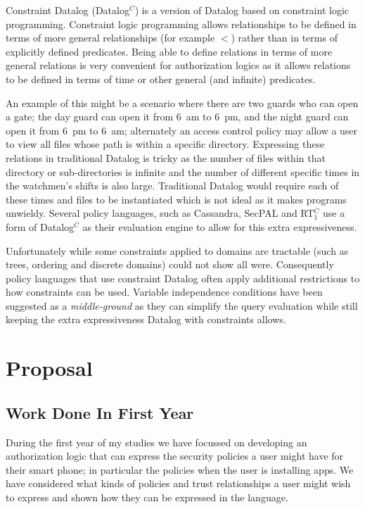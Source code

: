 \documentclass[a4paper,12pt,sfsidenotes]{tufte-book}
\begin{document}
Constraint Datalog (Datalog$^C$\cite{Li:2003ix}) is a version of Datalog based
on constraint logic programming.  Constraint logic programming allows
relationships to be defined in terms of more general relationships (for example
$<$) rather than in terms of explicitly defined predicates.  Being able to
define relations in terms of more general relations is very convenient for
authorization logics as it allows relations to be defined in terms of time or
other general (and infinite) predicates. 

An example of this might be a scenario where there are two guards who can open a
gate; the day guard can open it from 6~am to 6~pm, and the night guard can open
it from 6~pm to 6~am; alternately an access control policy may allow a user to
view all files whose path is within a specific directory.  Expressing these
relations in traditional Datalog is tricky as the number of files within that
directory or sub-directories is infinite and the number of different specific
times in the watchmen's shifts is also large.  Traditional Datalog would require
each of these times and files to be instantiated which is not ideal as it makes
programs unwieldy. Several policy languages, such as
Cassandra\cite{Becker:2004fi}, SecPAL\cite{Becker:2006vh} and
RT$_1^C$\cite{Li:2003ix} use a form of Datalog$^C$ as their evaluation engine to
allow for this extra expressiveness.

Unfortunately while some constraints applied to domains are tractable (such as
trees, ordering and discrete domains) \citeauthor*{Li:2003ix} could not show
all were.  Consequently policy languages that use constraint Datalog often apply
additional restrictions to how constraints can be used.  Variable independence
conditions\cite{Chomicki:2000tz} have been suggested as a \emph{middle-ground}
as they can simplify the query evaluation while still keeping the extra
expressiveness Datalog with constraints allows.


\section{Proposal}

\subsection{Work Done In First Year}

During the first year of my studies we have focussed on developing an
authorization logic that can express the security policies a user might have for
their smart phone; in particular the policies when the user is installing apps.
We have considered what kinds of policies and trust
relationships a user might wish to express and shown how they can be expressed
in the language.
\end{document}
